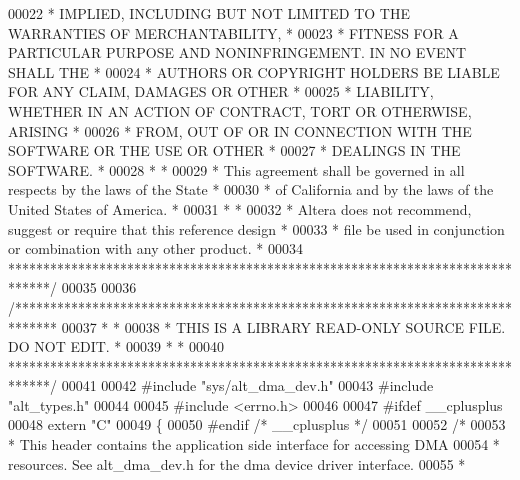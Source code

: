 \begin{DoxyCode}
00022 \textcolor{comment}{* IMPLIED, INCLUDING BUT NOT LIMITED TO THE WARRANTIES OF MERCHANTABILITY,    *}
00023 \textcolor{comment}{* FITNESS FOR A PARTICULAR PURPOSE AND NONINFRINGEMENT. IN NO EVENT SHALL THE *}
00024 \textcolor{comment}{* AUTHORS OR COPYRIGHT HOLDERS BE LIABLE FOR ANY CLAIM, DAMAGES OR OTHER      *}
00025 \textcolor{comment}{* LIABILITY, WHETHER IN AN ACTION OF CONTRACT, TORT OR OTHERWISE, ARISING     *}
00026 \textcolor{comment}{* FROM, OUT OF OR IN CONNECTION WITH THE SOFTWARE OR THE USE OR OTHER         *}
00027 \textcolor{comment}{* DEALINGS IN THE SOFTWARE.                                                   *}
00028 \textcolor{comment}{*                                                                             *}
00029 \textcolor{comment}{* This agreement shall be governed in all respects by the laws of the State   *}
00030 \textcolor{comment}{* of California and by the laws of the United States of America.              *}
00031 \textcolor{comment}{*                                                                             *}
00032 \textcolor{comment}{* Altera does not recommend, suggest or require that this reference design    *}
00033 \textcolor{comment}{* file be used in conjunction or combination with any other product.          *}
00034 \textcolor{comment}{******************************************************************************/}
00035 
00036 \textcolor{comment}{/******************************************************************************}
00037 \textcolor{comment}{*                                                                             *}
00038 \textcolor{comment}{* THIS IS A LIBRARY READ-ONLY SOURCE FILE. DO NOT EDIT.                       *}
00039 \textcolor{comment}{*                                                                             *}
00040 \textcolor{comment}{******************************************************************************/}
00041 
00042 \textcolor{preprocessor}{#include "sys/alt_dma_dev.h"}
00043 \textcolor{preprocessor}{#include "alt_types.h"}
00044 
00045 \textcolor{preprocessor}{#include <errno.h>}
00046 
00047 \textcolor{preprocessor}{#ifdef \_\_cplusplus}
00048 \textcolor{keyword}{extern} \textcolor{stringliteral}{"C"}
00049 \{
00050 \textcolor{preprocessor}{#endif }\textcolor{comment}{/* \_\_cplusplus */}\textcolor{preprocessor}{}
00051 
00052 \textcolor{comment}{/*}
00053 \textcolor{comment}{ * This header contains the application side interface for accessing DMA }
00054 \textcolor{comment}{ * resources. See alt\_dma\_dev.h for the dma device driver interface.}
00055 \textcolor{comment}{ *}

\end{DoxyCode}
